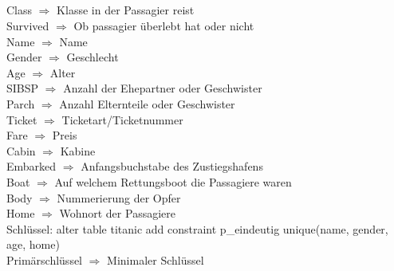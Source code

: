 \documentclass[a4paper,11pt,titlepage]{article}
\begin{document}
\subsection{}
Class $\Rightarrow$ Klasse in der Passagier reist\\
Survived $\Rightarrow$ Ob passagier überlebt hat oder nicht\\
Name $\Rightarrow$  Name \\
Gender $\Rightarrow$ Geschlecht\\
Age $\Rightarrow$ Alter\\
SIBSP $\Rightarrow$ Anzahl der Ehepartner oder Geschwister\\
Parch $\Rightarrow$ Anzahl Elternteile oder Geschwister\\
Ticket $\Rightarrow$ Ticketart/Ticketnummer\\
Fare $\Rightarrow$ Preis\\
Cabin $\Rightarrow$ Kabine\\
Embarked $\Rightarrow$ Anfangsbuchstabe des Zustiegshafens\\
Boat $\Rightarrow$ Auf welchem Rettungsboot die Passagiere waren\\
Body $\Rightarrow$ Nummerierung der Opfer\\
Home $\Rightarrow$ Wohnort der Passagiere\\
Schlüssel: alter table titanic add constraint p\_eindeutig unique(name, gender, age, home)\\
Primärschlüssel $\Rightarrow$ Minimaler Schlüssel
\end{document}
